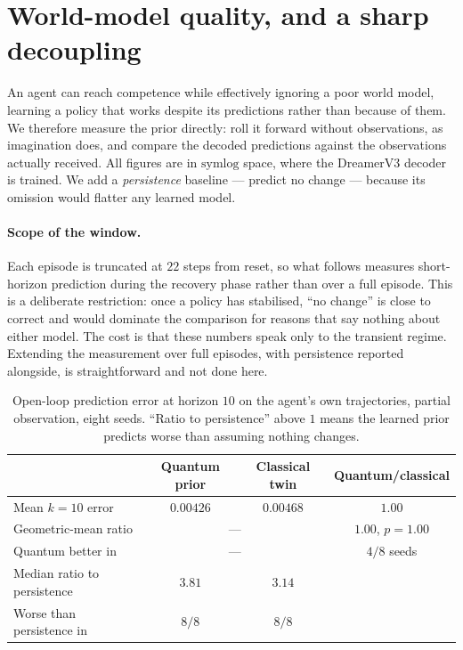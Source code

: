 \documentclass[11pt,onecolumn]{article}
\begin{document}
\section{World-model quality, and a sharp decoupling}
\label{sec:imagination}
An agent can reach competence while effectively ignoring a poor world
model, learning a policy that works despite its predictions rather than
because of them. We therefore measure the prior directly: roll it
forward without observations, as imagination does, and compare the
decoded predictions against the observations actually received. All
figures are in $\mathrm{symlog}$ space, where the DreamerV3 decoder is
trained. We add a \emph{persistence} baseline --- predict no change ---
because its omission would flatter any learned model.

\paragraph{Scope of the window.}
Each episode is truncated at $22$ steps from reset, so what follows
measures short-horizon prediction during the recovery phase rather than
over a full episode. This is a deliberate restriction: once a policy has
stabilised, ``no change'' is close to correct and would dominate the
comparison for reasons that say nothing about either model. The cost is
that these numbers speak only to the transient regime. Extending the
measurement over full episodes, with persistence reported alongside, is
straightforward and not done here.

\begin{table}[htb]\centering\small
\caption{Open-loop prediction error at horizon $10$ on the agent's own
trajectories, partial observation, eight seeds. ``Ratio to
persistence'' above $1$ means the learned prior predicts worse than
assuming nothing changes.}
\label{tab:imagination}
\begin{tabular}{lccc}
\toprule
& Quantum prior & Classical twin & Quantum/classical \\
\midrule
Mean $k{=}10$ error      & $0.00426$ & $0.00468$ & $1.00$ \\
Geometric-mean ratio     & \multicolumn{2}{c}{---} & $1.00$, $p = 1.00$ \\
Quantum better in        & \multicolumn{2}{c}{---} & $4/8$ seeds \\
\midrule
Median ratio to persistence & $3.81$ & $3.14$ & \\
Worse than persistence in   & $8/8$  & $8/8$  & \\
\bottomrule
\end{tabular}
\end{table}
\end{document}
